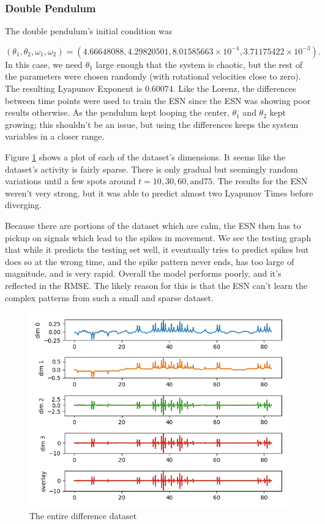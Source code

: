 \documentclass{article}
\begin{document}
\subsubsection{Double Pendulum}

The double pendulum's initial condition was 

\begin{equation}
(\theta_1, \theta_2, \omega_1, \omega_2) 
= (4.66648088, 4.29820501,
8.01585663 \times 10^{-4}, 3.71175422 \times 10^{-3}).
\end{equation}
In this case, we
need $\theta_1$ large enough that the system is chaotic, but the rest of
the parameters were chosen randomly (with rotational velocities close to
zero). The resulting Lyapunov Exponent is $0.60074$. 
Like the Lorenz, the differences between time points
were used to train the ESN since the ESN was showing poor results
otherwise. As the pendulum kept looping the center, $\theta_1$ and 
$\theta_2$ kept growing; this shouldn't be an issue, but using
the differences keeps the system variables in a closer range.

Figure \ref{fig:doub_pend_diff} shows a plot of each
of the dataset's dimensions. It seems like the dataset's activity is
fairly sparse. There is only gradual but seemingly random variations until
a few spots around $t=10, 30, 60, \text{and} 75$.
The results for the ESN weren't very strong, but it was able to predict
almost two Lyapunov Times before diverging. 

Because there are portions of the dataset which are calm, the ESN then has
to pickup on signals which lead to the spikes in movement.
We see the testing graph that while it predicts the testing set well,
it eventually tries to predict spikes but does so at the wrong time,
and the spike pattern never ends, has too large of magnitude, and is very 
rapid. Overall the model performs poorly, and it's reflected in the RMSE.
The likely reason for this is that the ESN can't learn the complex
patterns from such a small and sparse dataset.

\begin{figure}[H]
    \centering
    \includegraphics[width=.5\linewidth]{doc/paper/images/doub_pend/full_differential.png}
    \caption{The entire difference dataset}
    \label{fig:doub_pend_diff}
\end{figure}
\end{document}
